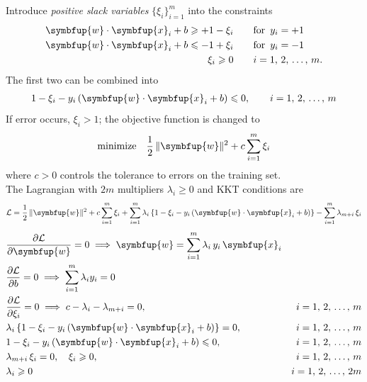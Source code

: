 \documentclass[11pt]{extarticle}
\newcommand{\ds}{\displaystyle}
\newcommand{\ie}{\;\Longrightarrow\;}
\newcommand{\vx}{\symbfup{x}}
\newcommand{\vw}{\symbfup{w}}
\theoremstyle{definition}
\begin{document}
\noindent Introduce \emph{positive slack variables} $\ds\{\xi_i\}_{i=1}^m$ into the constraints
\begingroup
\addtolength{\jot}{-3pt}
\begin{align*}
  \vw\cdot\vx_i + b \geqslant +1 - \xi_i &\qquad\text{for }\,y_i=+1\\
  \vw\cdot\vx_i + b \leqslant -1 + \xi_i &\qquad\text{for }\,y_i=-1\\
  \xi_i\geqslant 0  &\qquad i=1,\,2,\,\ldots,\,m.
\end{align*}
\endgroup
The first two can be combined into
\begin{align*}
  1 - \xi_i - y_i\left(\vw\cdot\vx_i + b \right)\leqslant 0,\qquad i=1,\,2,\,\ldots,\,m
\end{align*}
If error occurs, $\xi_i > 1$; the objective function is changed to
\begin{align*}
  \text{minimize}\quad\frac{1}{2}\,\|\vw\|^2 + c\sum_{i=1}^m \xi_i
\end{align*}
where $c > 0$ controls the tolerance to errors on the training set. \\The Lagrangian with $2m$ multipliers $\lambda_i\geqslant 0$ and KKT conditions are
\begin{align}\label{f:lag1}
  \mathcal{L} = \frac{1}{2}\,\|\vw\|^2 + c\sum_{i=1}^m\xi_i + \sum_{i=1}^m\lambda_i\left\{1 - \xi_i - y_i\left(\vw\cdot\vx_i + b\right)\right\} - \sum_{i=1}^m\lambda_{m + i}\,\xi_i
\end{align}
\vspace{-8mm}
\begingroup
\addtolength{\jot}{-2pt}
\begin{equation}
\begin{aligned}\label{f:kkt1}
  &\frac{\partial\mathcal{L}}{\partial \vw} = 0 \ie \vw=\sum_{i=1}^m\lambda_i\,y_i\,\vx_i &\\
  &\frac{\partial\mathcal{L}}{\partial b} = 0 \ie \sum_{i=1}^m\lambda_iy_i=0 & \\
  &\frac{\partial\mathcal{L}}{\partial\xi_i} = 0 \ie c - \lambda_i-\lambda_{m + i} = 0, &i=1,\,2,\,\ldots,\,m\\
&\lambda_i\left\{1 - \xi_i - y_i\left(\vw\cdot\vx_i + b \right)\right\} = 0, &i=1,\,2,\,\ldots,\,m \\
  &1 - \xi_i - y_i\left(\vw\cdot\vx_i + b \right)\leqslant 0,\; &i=1,\,2,\,\ldots,\,m\\
  &\lambda_{m + i}\,\xi_i = 0,\quad\xi_i\geqslant 0, \quad & i=1,\,2,\,\ldots,\,m\\
  &\lambda_i\geqslant 0\qquad &i=1,\,2,\,\ldots,\,2m
\end{aligned}
\end{equation}
\end{document}
